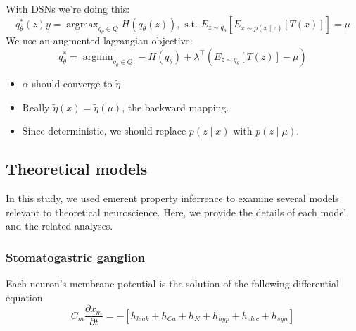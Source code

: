 \documentclass[11pt]{article}
\DeclareMathOperator*{\argmin}{argmin}
\DeclareMathOperator*{\argmax}{argmax}
\begin{document}
With DSNs we're doing this:
\begin{equation}
q_\theta^*(z) y= \argmax_{q_\theta \in Q} H(q_\theta(z)),   \text{  s.t.  } E_{z \sim q_\theta}\left[ E_{x\sim p(x \mid z)}\left[T(x)\right] \right] = \mu
\end{equation}
We use an augmented lagrangian objective:
\begin{equation}
q_\theta^* = \argmin_{q_\theta \in Q} - H(q_\theta) + \lambda^\top \left(E_{z \sim q_\theta} \left[T(z) \right] - \mu \right)
\end{equation}
\begin{itemize}
\item $\alpha$ should converge to $\tilde{\eta}$
\item Really $\tilde{\eta}(x) = \tilde{\eta}(\mu)$, the backward mapping.
\item Since deterministic, we should replace $p(z \mid x)$ with $p(z \mid \mu)$.
\end{itemize}


\subsection{Theoretical models}
In this study, we used emerent property inferrence to examine several models relevant to theoretical neuroscience.  Here, we provide the details of each model  and the related analyses.

\subsubsection{Stomatogastric ganglion}
Each neuron's membrane potential is the solution of the following differential equation.
\begin{equation} C_m \frac{\partial x_m}{\partial t} = - \left[ h_{leak} + h_{Ca} + h_K + h_{hyp} + h_{elec} + h_{syn}\right] 
\end{equation} 
\end{document}
